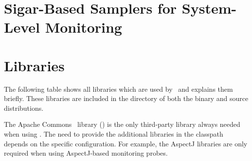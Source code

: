 \chapter{Sigar-Based Samplers for System-Level Monitoring}\label{appendix:SigarBasedSamplers}


\chapter{Libraries}\label{appendix:libraries}
    The following table shows all libraries which are used by \Kieker\ and explains them briefly. %
These libraries are included in the  directory of both the \Kieker{} binary and %
source distributions.

The Apache Commons~\cite{CommonsLogging-WebSite} library (\file{\commonsLoggingJar}) %
is the only third-party library always needed when using \Kieker{}. %
The need to provide the additional libraries in the classpath depends on the %
specific configuration. For example, the AspectJ libraries are only required %
when using AspectJ-based monitoring probes.

    

